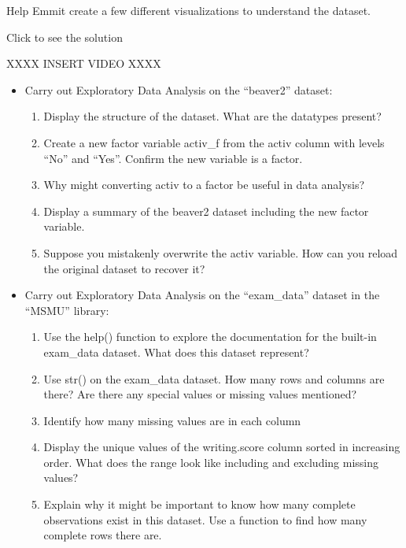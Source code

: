 \documentclass[
  letterpaper,
  DIV=11,
  numbers=noendperiod]{scrreprt}
\providecommand{\tightlist}{%
  \setlength{\itemsep}{0pt}\setlength{\parskip}{0pt}}
\begin{document}
\begin{tcolorbox}[enhanced jigsaw, colframe=quarto-callout-tip-color-frame, colback=white, breakable, rightrule=.15mm, title=\textcolor{quarto-callout-tip-color}{\faLightbulb}\hspace{0.5em}{Try it Out}, bottomtitle=1mm, toptitle=1mm, titlerule=0mm, left=2mm, coltitle=black, colbacktitle=quarto-callout-tip-color!10!white, leftrule=.75mm, opacitybacktitle=0.6, bottomrule=.15mm, opacityback=0, arc=.35mm, toprule=.15mm]

Help Emmit create a few different visualizations to understand the
dataset.

Click to see the solution

XXXX INSERT VIDEO XXXX

\end{tcolorbox}

\begin{itemize}
\tightlist
\item
  Carry out Exploratory Data Analysis on the ``beaver2'' dataset:

  \begin{enumerate}
  \def\labelenumi{\alph{enumi})}
  \tightlist
  \item
    Display the structure of the dataset. What are the datatypes
    present?
  \item
    Create a new factor variable activ\_f from the activ column with
    levels ``No'' and ``Yes''. Confirm the new variable is a factor.
  \item
    Why might converting activ to a factor be useful in data analysis?
  \item
    Display a summary of the beaver2 dataset including the new factor
    variable.
  \item
    Suppose you mistakenly overwrite the activ variable. How can you
    reload the original dataset to recover it?
  \end{enumerate}
\item
  Carry out Exploratory Data Analysis on the ``exam\_data'' dataset in
  the ``MSMU'' library:

  \begin{enumerate}
  \def\labelenumi{\alph{enumi})}
  \tightlist
  \item
    Use the help() function to explore the documentation for the
    built-in exam\_data dataset. What does this dataset represent?
  \item
    Use str() on the exam\_data dataset. How many rows and columns are
    there? Are there any special values or missing values mentioned?
  \item
    Identify how many missing values are in each column
  \item
    Display the unique values of the writing.score column sorted in
    increasing order. What does the range look like including and
    excluding missing values?
  \item
    Explain why it might be important to know how many complete
    observations exist in this dataset. Use a function to find how many
    complete rows there are.
  \end{enumerate}
\end{itemize}
\end{document}
